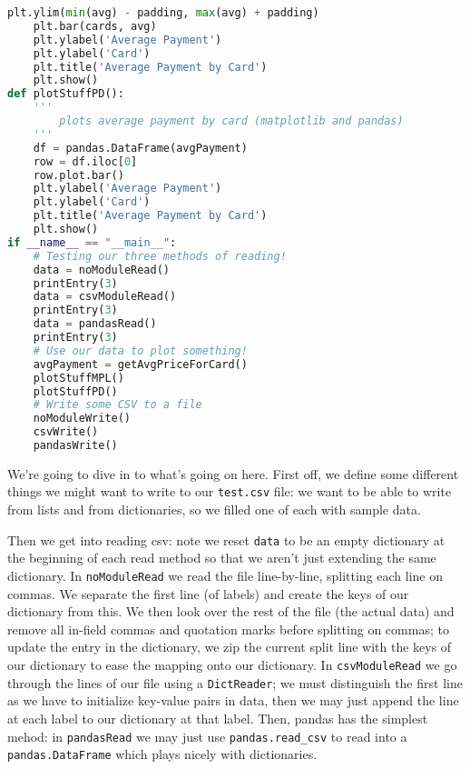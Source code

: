 \documentclass[12pt, twoside, reqno]{book}
\begin{document}
\begin{lstlisting}[language=Python]
    plt.ylim(min(avg) - padding, max(avg) + padding)
    plt.bar(cards, avg)
    plt.ylabel('Average Payment')
    plt.ylabel('Card')
    plt.title('Average Payment by Card')
    plt.show()
def plotStuffPD():
    '''
        plots average payment by card (matplotlib and pandas)
    '''
    df = pandas.DataFrame(avgPayment)
    row = df.iloc[0]
    row.plot.bar()
    plt.ylabel('Average Payment')
    plt.ylabel('Card')
    plt.title('Average Payment by Card')
    plt.show()
if __name__ == "__main__":
    # Testing our three methods of reading!
    data = noModuleRead()
    printEntry(3)
    data = csvModuleRead()
    printEntry(3)
    data = pandasRead()
    printEntry(3)
    # Use our data to plot something!
    avgPayment = getAvgPriceForCard()
    plotStuffMPL()
    plotStuffPD()
    # Write some CSV to a file
    noModuleWrite()
    csvWrite()
    pandasWrite()
\end{lstlisting}

We're going to dive in to what's going on here. First off, we define some different things we might want to write to our \texttt{test.csv} file: we want to be able to write from lists and from dictionaries, so we filled one of each with sample data.

Then we get into reading csv: note we reset \texttt{data} to be an empty dictionary at the beginning of each read method so that we aren't just extending the same dictionary. In \texttt{noModuleRead} we read the file line-by-line, splitting each line on commas. We separate the first line (of labels) and create the keys of our dictionary from this. We then look over the rest of the file (the actual data) and remove all in-field commas and quotation marks before splitting on commas; to update the entry in the dictionary, we zip the current split line with the keys of our dictionary to ease the mapping onto our dictionary. In \texttt{csvModuleRead} we go through the lines of our file using a \texttt{DictReader}; we must distinguish the first line as we have to initialize key-value pairs in data, then we may just append the line at each label to our dictionary at that label. Then, pandas has the simplest mehod: in \texttt{pandasRead} we may just use \texttt{pandas.read\_csv} to read into a \texttt{pandas.DataFrame} which plays nicely with dictionaries.
\end{document}
